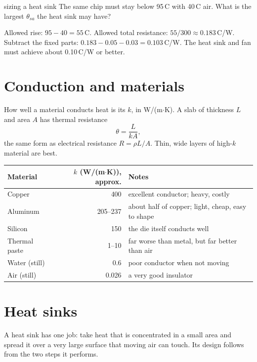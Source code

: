 \begin{worked}{sizing a heat sink}
The same chip must stay below 95\,\textdegree C with 40\,\textdegree C air. What is the largest $\theta_{sa}$ the heat sink may have?

Allowed rise: $95 - 40 = 55$\,\textdegree C. Allowed total resistance: $55/300 \approx 0.183$\,\textdegree C/W. Subtract the fixed parts: $0.183 - 0.05 - 0.03 = 0.103$\,\textdegree C/W. The heat sink and fan must achieve about 0.10\,\textdegree C/W or better.
\end{worked}

\section{Conduction and materials}

How well a material conducts heat is its  $k$, in W/(m$\cdot$K). A slab of thickness $L$ and area $A$ has thermal resistance
\[
  \theta = \frac{L}{k A},
\]
the same form as electrical resistance $R = \rho L / A$. Thin, wide layers of high-$k$ material are best.

\begin{center}
\begin{tabular}{lrl}
\toprule
Material & $k$ (W/(m$\cdot$K)), approx. & Notes \\
\midrule
Copper & 400 & excellent conductor; heavy, costly \\
Aluminum & 205--237 & about half of copper; light, cheap, easy to shape \\
Silicon & 150 & the die itself conducts well \\
Thermal paste & 1--10 & far worse than metal, but far better than air \\
Water (still) & 0.6 & poor conductor when not moving \\
Air (still) & 0.026 & a very good insulator \\
\bottomrule
\end{tabular}
\end{center}

\section{Heat sinks}

A heat sink has one job: take heat that is concentrated in a small area and spread it over a very large surface that moving air can touch. Its design follows from the two steps it performs.

